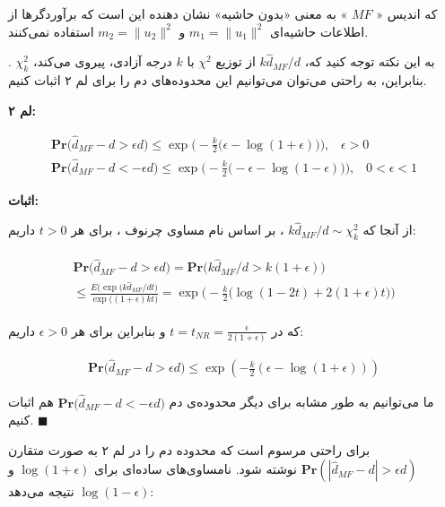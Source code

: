 که اندیس «
$MF$
» به معنی «بدون حاشیه»
نشان دهنده این است که برآوردگرها از اطلاعات حاشیه‌ای 
$m_1 = \| u_1 \|^2$
و 
$m_2 = \| u_2 \|^2$
استفاده نمی‌کنند.

به این نکته توجه کنید که، 
$k \hat{d}_{MF} / d$
از توزیع 
$\chi^2$
با 
$k$
درجه آزادی، پیروی می‌کند،
$\chi_k^2$
. بنابراین، به راحتی می‌توان می‌توانیم این محدوده‌‌های دم را برای لم ۲ اثبات کنیم.

\textbf{
لم ۲:
}

\begin{align}
\mathbf{Pr} \big( \hat{d}_{MF} - d > \epsilon d) \leq \exp \Bigg( - \frac{k}{2} \big( \epsilon - \log( 1+ \epsilon) \big) \Bigg), \;\;\; \epsilon > 0 
\label{eq:1iE} \\
\mathbf{Pr} \big( \hat{d}_{MF} - d < -\epsilon d) \leq \exp \Bigg( - \frac{k}{2} \big( -\epsilon - \log( 1 - \epsilon) \big) \Bigg), \;\;\; 0 < \epsilon < 1 
\label{eq:1iF} 
\end{align}

\textbf{
اثبات:
}

از آنجا که 
$k \hat{d}_{MF} / d \sim \chi_k^2 $
، بر اساس نام مساوی چرنوف
\cite{litez46}
، برای هر 
$t > 0$ 
داریم:

\begin{align}
\begin{split}
\mathbf{Pr} \big( \hat{d}_{MF} - d > \epsilon d) = 
\mathbf{Pr} \big( k \hat{d}_{MF} / d > k(1+\epsilon) \big) \\
\leq 
\frac{E\bigg( \exp (k \hat{d}_{MF} /dt \bigg) }{\exp \big( (1+\epsilon ) kt \big) } =
\exp \Bigg( - \frac{k}{2} \big( \log (1-2t) + 2(1 + \epsilon) t \big) \Bigg)
\end{split}
\label{eq:1iG}
\end{align}

که در 
$t = t_{NR} = \frac{\epsilon}{2(1+\epsilon)}$
و بنابراین برای هر 
$\epsilon > 0$
داریم:

\begin{align}
\mathbf{Pr} \big( \hat{d}_{MF} - d > \epsilon d) \leq \exp \left( -\frac{k}{2} \left( \epsilon - \log \left( 1 + \epsilon \right) \right) \right)
\label{eq:1iH}
\end{align}

ما می‌توانیم به طور مشابه برای دیگر محدوده‌ی دم 
$\mathbf{Pr} \big( \hat{d}_{MF} - d < -\epsilon d)$
هم اثبات کنیم.
$\blacksquare$

\bigskip

برای راحتی مرسوم است که محدوده دم را در لم ۲ به صورت متقارن 
$\mathbf{Pr} \left( \left| \hat{d}_{MF} - d \right| > \epsilon d \right)$
نوشته شود. نامساوی‌های ساده‌ای برای 
$\log(1+\epsilon)$
و 
$\log(1-\epsilon)$
نتیجه می‌دهد:


